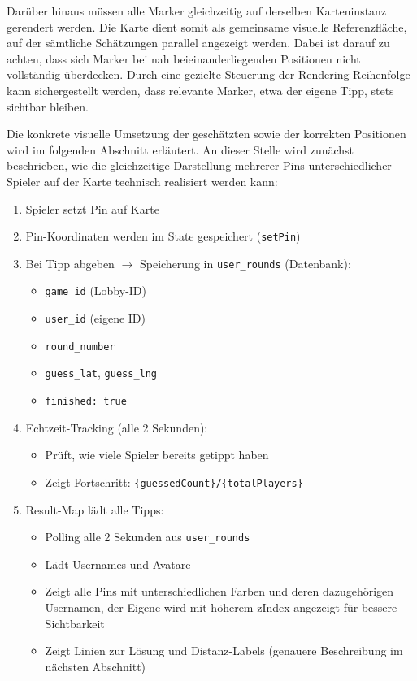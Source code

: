 Darüber hinaus müssen alle Marker gleichzeitig auf derselben Karteninstanz gerendert werden. Die Karte dient somit als gemeinsame visuelle Referenzfläche, auf der sämtliche Schätzungen parallel angezeigt werden. Dabei ist darauf zu achten, dass sich Marker bei nah beieinanderliegenden Positionen nicht vollständig überdecken. Durch eine gezielte Steuerung der Rendering-Reihenfolge kann sichergestellt werden, dass relevante Marker, etwa der eigene Tipp, stets sichtbar bleiben.

Die konkrete visuelle Umsetzung der geschätzten sowie der korrekten Positionen wird im folgenden Abschnitt erläutert. An dieser Stelle wird zunächst beschrieben, wie die gleichzeitige Darstellung mehrerer Pins unterschiedlicher Spieler auf der Karte technisch realisiert werden kann:
\begin{enumerate}
    \item Spieler setzt Pin auf Karte
    \item Pin-Koordinaten werden im State gespeichert (\texttt{setPin})
    \item Bei {Tipp abgeben} $\rightarrow$ Speicherung in \texttt{user\_rounds} (Datenbank):
    \begin{itemize}
      \item \texttt{game\_id} (Lobby-ID)
      \item \texttt{user\_id} (eigene ID)
      \item \texttt{round\_number}
      \item \texttt{guess\_lat}, \texttt{guess\_lng}
      \item \texttt{finished: true}
    \end{itemize}
    \item Echtzeit-Tracking (alle 2 Sekunden):
    \begin{itemize}
      \item Prüft, wie viele Spieler bereits getippt haben
      \item Zeigt Fortschritt: \texttt{\{guessedCount\}/\{totalPlayers\}}
    \end{itemize}
    \item Result-Map lädt alle Tipps:
    \begin{itemize}
      \item Polling alle 2 Sekunden aus \texttt{user\_rounds}
      \item Lädt Usernames und Avatare
      \item Zeigt alle Pins mit unterschiedlichen Farben und deren dazugehörigen Usernamen, der Eigene wird mit höherem zIndex angezeigt für bessere Sichtbarkeit
      \item Zeigt Linien zur Lösung und Distanz-Labels (genauere Beschreibung im nächsten Abschnitt)
    \end{itemize}
\end{enumerate}
